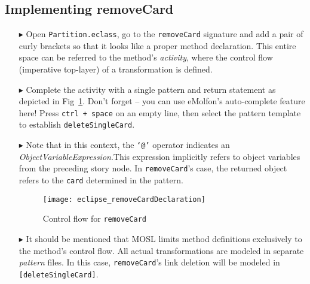\newpage
\hypertarget{remCard tex}{}
\subsection{Implementing removeCard}
\texHeader

\begin{itemize}

\item[$\blacktriangleright$] Open \texttt{Partition.eclass}, go to the \texttt{removeCard} signature and add a pair of curly brackets so that it looks like a
proper method declaration. This entire space can be referred to the method's \emph{activity}, where the control flow (imperative top-layer) of a
transformation is defined.

\item[$\blacktriangleright$] Complete the activity with a single pattern and return statement as depicted in Fig~\ref{fig:remCardDec}. Don't forget -- you can
use eMolfon's auto-complete feature here! Press \texttt{ctrl + space} on an empty line, then select the pattern template to establish \texttt{deleteSingleCard}.

\item[$\blacktriangleright$] Note that in this context, the \texttt{`@'} operator indicates an
\emph{ObjectVariableExpression}.This expression implicitly refers to object variables from the preceding story
node. In \texttt{removeCard}'s case, the returned object refers to the \texttt{card} determined in the pattern.

\vspace{0.5cm}

\begin{figure}[htp]
\begin{center}
  \texttt{[image: eclipse\_removeCardDeclaration]}
  \caption{Control flow for \texttt{removeCard}}
  \label{fig:remCardDec}
\end{center}
\end{figure}

\item[$\blacktriangleright$] It should be mentioned that MOSL limits method definitions exclusively to the method's control flow. All actual transformations are
modeled in separate \emph{pattern} files. In this case, \texttt{removeCard}'s link deletion will be modeled in \texttt{[deleteSingleCard]}.

\vspace{0.5cm}


\end{itemize}
